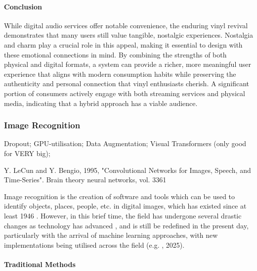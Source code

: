            \paragraph{Conclusion}
                While digital audio services offer notable convenience, the enduring vinyl revival demonstrates that many users still value tangible, nostalgic experiences. Nostalgia and charm play a crucial role in this appeal, making it essential to design with these emotional connections in mind. By combining the strengths of both physical and digital formats, a system can provide a richer, more meaningful user experience that aligns with modern consumption habits while preserving the authenticity and personal connection that vinyl enthusiasts cherish. A significant portion of consumers actively engage with both streaming services and physical media, indicating that a hybrid approach has a viable audience.
    
        \subsubsection{Image Recognition}
    
            \begin{temp}
                Dropout; GPU-utilisation; Data Augmentation; Visual Transformers (only good for VERY big);
                
                Y. LeCun and Y. Bengio, 1995, "Convolutional Networks for Images, Speech, and Time-Series". Brain theory neural networks, vol. 3361
            \end{temp}
    
            Image recognition is the creation of software and tools which can be used to identify objects, places, people, etc. in digital images, which has existed since at least 1946 \cite{hall1979computer}. However, in this brief time, the field has undergone several drastic changes as technology has advanced \cite{imagenetclasscnn}, and is still be redefined in the present day, particularly with the arrival of machine learning approaches, with new implementations being utilised across the field (e.g. \cite{RAMPRASAD2025100556}, 2025).
    
            \paragraph{Traditional Methods}
            
